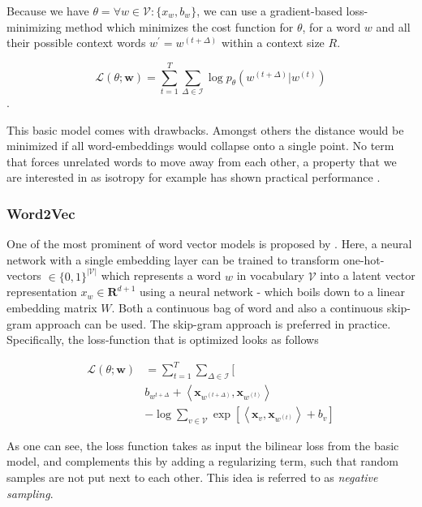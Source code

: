 \documentclass[a4paper,12pt,twoside,openright]{report}
\begin{document}
Because we have $\theta = \forall w \in \mathcal{V} : \{ x_w, b_w \}$, we can use a gradient-based loss-minimizing method which minimizes the cost function for $\theta$, for a word $w$ and all their possible context words $w^{\prime} = w^{(t+\Delta)}$ within a context size $R$.

$$
\mathcal{L}(\theta ; \mathbf{w})=\sum_{t=1}^{T} \sum_{\Delta \in \mathcal{I}} \log p_{\theta}\left(w^{(t+\Delta)} | w^{(t)}\right)
$$.

This basic model comes with drawbacks. 
Amongst others the distance would be minimized if all word-embeddings would collapse onto a single point. 
No term that forces unrelated words to move away from each other, a property that we are interested in as isotropy for example has shown practical performance \cite{ethayarajh19}.


\subsubsection{Word2Vec}

One of the most prominent of word vector models is proposed by \cite{mikolov13, mikolov13b}.
Here, a neural network with a single embedding layer can be trained to transform one-hot-vectors $\in \{ 0, 1 \}^{| \mathcal{V} |}$ which represents a word $w$ in vocabulary $\mathcal{V}$
into a latent vector representation $x_w \in \mathbf{R}^{d + 1}$ using a neural network - which boils down to a linear embedding matrix $W$.
Both a continuous bag of word and also a continuous skip-gram approach can be used.
The skip-gram approach is preferred in practice.
Specifically, the loss-function that is optimized looks as follows

\begin{align} 
\mathcal{L}(\theta ; \mathbf{w}) & =\sum_{t=1}^{T} \sum_{\Delta \in \mathcal{I}} [\\ 
& b_{w^{t+\Delta}} +\left\langle \mathbf{x}_{w^{(t+\Delta)}}, \mathbf{x}_{w^{(t)}} \right\rangle \\
& -\log \sum_{v \in \mathcal{V}} \exp \left[\left\langle\mathbf{x}_{v}, \mathbf{x}_{w^{(t)}}\right\rangle+b_{v} \right] 
\end{align}

As one can see, the loss function takes as input the bilinear loss from the basic model, and complements this by adding a regularizing term, such that random samples are not put next to each other.
This idea is referred to as \textit{negative sampling}.
\end{document}
